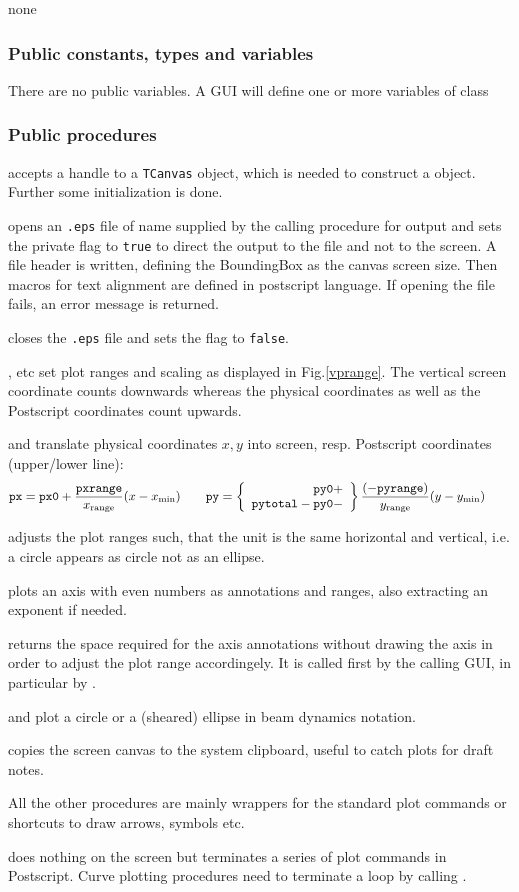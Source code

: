 \documentclass[12pt]{article}
\newcommand\code[1]{{\tt #1}}
\newcommand{\unico}[1]{{\color{burntorange}\code{#1}}}
\newcommand{\opaguif}[1]{\colorbox{violet!30}{{\color{black}\code{#1}}}}
\newcommand{\oguif}[1]{\hyperref[#1]{\opaguif{#1}}}
\newcommand{\uses}[1]{\flushleft {\bf Uses:} #1}
\newcommand{\pvar}[1]{\subsubsection*{Public constants, types and variables} #1}
\newcommand{\ppro}[1]{\subsubsection*{Public procedures} #1}
\begin{document}
\uses{none}

\pvar{
There are no public variables. A GUI will define one or more variables of class \unico{Vplot}
}

\ppro{
\unico{Create} accepts a handle to a \code{TCanvas} object, which is needed to construct a \unico{Vplot} object. Further some initialization is done.

\unico{PS\_start} opens an \code{*.eps} file of name \unico{psfile} supplied by the calling procedure for output and sets the private flag \unico{PS} to \code{true} to direct the output to the file and not to the screen. A file header is written, defining the BoundingBox as the canvas screen size. Then macros for text alignment are defined in postscript language. If opening the file fails, an error message is returned.

\unico{PS\_stop} closes the \code{*.eps} file and sets the flag \unico{PS} to \code{false}.

\unico{SetRange*}, \unico{SetMargin*} etc set plot ranges and scaling as displayed in Fig.\ref{vprange}. The vertical screen coordinate counts downwards whereas the physical coordinates as well as the Postscript coordinates count upwards. 

\unico{getpx,getpy} and \unico{PS\_getpxr,PS\_getpyr} translate physical coordinates $x,y$ into screen, resp. Postscript coordinates (upper/lower line):
\[
{\tt px}={\tt px0}+\frac{\tt pxrange}{x_{\rm range}} (x-x_{\rm min}) \qquad
{\tt py}=\left\{ \begin{array}{r} {\tt py0} + \\ {\tt pytotal} - {\tt py0} -  \end{array} \right\} \frac{(-{\tt pyrange})}{y_{\rm range}} (y-y_{\rm min}) \qquad
\]

\unico{AdjustAspectRatio} adjusts the plot ranges such, that the unit is the same horizontal and vertical, i.e. a circle appears as circle not as an ellipse.

\unico{Axis} plots an axis with even numbers as annotations and ranges, also extracting an exponent if needed. 

\unico{GetAxisSpace} returns the space required for the axis annotations without drawing the axis in order to adjust the plot range accordingely. It is called first by the calling GUI, in particular by \oguif{../com/asfigure}.

\unico{Circle} and \unico{Ellipse} plot a circle or a (sheared) ellipse in beam dynamics notation.

\unico{GrabImage} copies the screen canvas to the system clipboard, useful to catch plots for draft notes.

All the other procedures are mainly wrappers for the standard plot commands or shortcuts to draw arrows, symbols etc.

\unico{Stroke} does nothing on the screen but terminates a series of plot commands in Postscript. Curve plotting procedures need to terminate a \unico{LineTo...} loop by calling \unico{stroke}.
}
\end{document}
